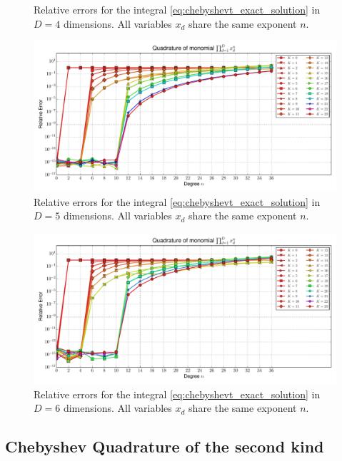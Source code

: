 \documentclass[a4paper,10pt]{article}
\begin{document}
\begin{subfigures}
\begin{figure}
    \caption{Relative errors for the integral \eqref{eq:chebyshevt_exact_solution}
    in $D=4$ dimensions. All variables $x_d$ share the same exponent $n$.}
    \label{fig:monomial_errors_chebyshevt_multivariate_dimension_4}
  \end{figure}
  \begin{figure}\centering
    \includegraphics[width=\linewidth]{./img/monomial_errors_chebyshevt_multivariate_dimension_5.pdf}
    \caption{Relative errors for the integral \eqref{eq:chebyshevt_exact_solution}
    in $D=5$ dimensions. All variables $x_d$ share the same exponent $n$.}
    \label{fig:monomial_errors_chebyshevt_multivariate_dimension_5}
  \end{figure}
  \begin{figure}\centering
    \includegraphics[width=\linewidth]{./img/monomial_errors_chebyshevt_multivariate_dimension_6.pdf}
    \caption{Relative errors for the integral \eqref{eq:chebyshevt_exact_solution}
    in $D=6$ dimensions. All variables $x_d$ share the same exponent $n$.}
    \label{fig:monomial_errors_chebyshevt_multivariate_dimension_6}
  \end{figure}
\end{subfigures}

\FloatBarrier
\subsection{Chebyshev Quadrature of the second kind}
\end{document}

